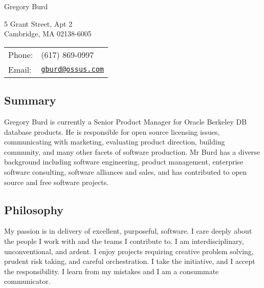 \documentclass[letterpaper]{article}
\def\name{Gregory Burd}
\renewenvironment{itemize}{
  \begin{list}{}{
    \setlength{\leftmargin}{1.5em}
  }
}{
  \end{list}
}
\begin{document}
{\huge \name}


\vspace{0.25in}

\begin{minipage}{0.45\linewidth}
  5 Grant Street, Apt 2 \\
  Cambridge, MA 02138-6005
\end{minipage}
\begin{minipage}{0.45\linewidth}
  \begin{tabular}{ll}
    Phone: & (617) 869-0997 \\
    Email: & \href{mailto:gburd@ossus.com}{\tt gburd@ossus.com} \\
  \end{tabular}
\end{minipage}

\vspace{0.25in}

\subsection*{Summary}

\begin{itemize}
\item Gregory Burd is currently a Senior Product Manager for Oracle Berkeley DB database products. He is responsible for open source licensing issues, communicating with marketing, evaluating product direction, building community, and many other facets of software production. Mr Burd has a diverse background including software engineering, product management, enterprise software consulting, software alliances and sales, and has contributed to open source and free software projects.
\end{itemize}

\subsection*{Philosophy}
\begin{itemize}
\item My passion is in delivery of excellent, purposeful, software. I care deeply about the people I work with and the teams I contribute to. I am interdisciplinary, unconventional, and ardent. I enjoy projects requiring creative problem solving, prudent risk taking, and careful orchestration. I take the initiative, and I accept the responsibility. I learn from my mistakes and I am a consummate communicator.
\end{itemize}
\end{document}
